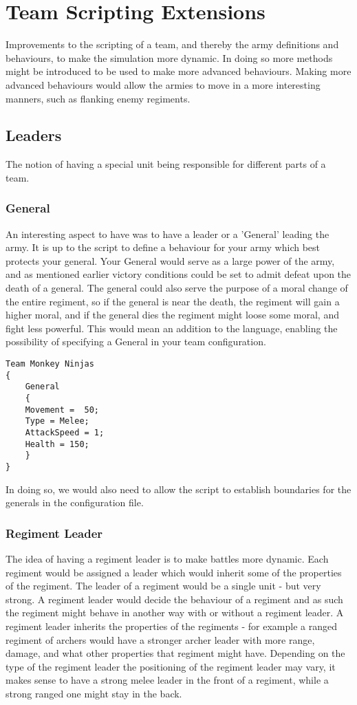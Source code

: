 \section{Team Scripting Extensions}
Improvements to the scripting of a team, and thereby the army definitions and behaviours, to make the simulation more dynamic. In doing so more methods might be introduced to be used to make more advanced behaviours. Making more advanced behaviours would allow the armies to move in a more interesting manners, such as flanking enemy regiments.
\subsection{Leaders}
The notion of having a special unit being responsible for different parts of a team.
\subsubsection*{General}
An interesting aspect to have was to have a leader or a 'General' leading the army. It is up to the script to define a behaviour for your army which best protects your general. Your General would serve as a large power of the army, and as mentioned earlier victory conditions could be set to admit defeat upon the death of a general.\label{moral} The general could also serve the purpose of a moral change of the entire regiment, so if the general is near the death, the regiment will gain a higher moral, and if the general dies the regiment might loose some moral, and fight less powerful. This would mean an addition to the language, enabling the possibility of specifying a General in your team configuration.
\begin{lstlisting}
Team Monkey Ninjas
{
	General
	{
	Movement =  50;
	Type = Melee;
	AttackSpeed = 1;
	Health = 150;
	}
}

\end{lstlisting}
In doing so, we would also need to allow the script to establish boundaries for the generals in the configuration file.
\subsubsection*{Regiment Leader}
The idea of having a regiment leader is to make battles more dynamic. Each regiment would be assigned a leader which would inherit some of the properties of the regiment.
The leader of a regiment would be a single unit - but very strong. A regiment leader would decide the behaviour of a regiment and as such the regiment might behave in another way with or without a regiment leader. A regiment leader inherits the properties of the regiments - for example a ranged regiment of archers would have a stronger archer leader with more range, damage, and what other properties that regiment might have. Depending on the type of the regiment leader the positioning of the regiment leader may vary, it makes sense to have a strong melee leader in the front of a regiment, while a strong ranged one might stay in the back.


